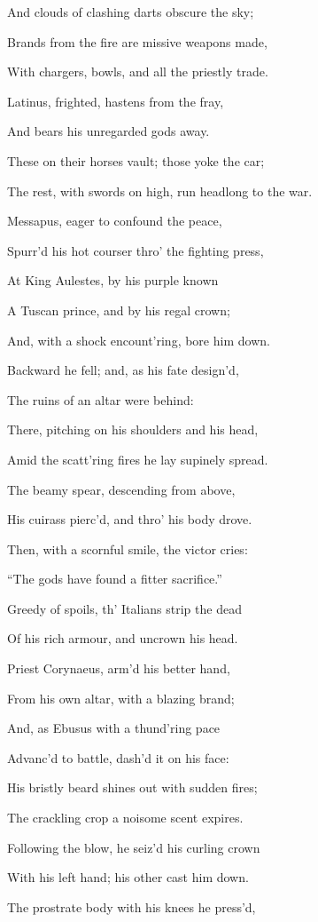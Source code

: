 And clouds of clashing darts obscure the sky;

Brands from the fire are missive weapons made,

With chargers, bowls, and all the priestly trade.

Latinus, frighted, hastens from the fray,

And bears his unregarded gods away.

These on their horses vault; those yoke the car;

The rest, with swords on high, run headlong to the war.

Messapus, eager to confound the peace,

Spurr’d his hot courser thro’ the fighting press,

At King Aulestes, by his purple known

A Tuscan prince, and by his regal crown;

And, with a shock encount’ring, bore him down.

Backward he fell; and, as his fate design’d,

The ruins of an altar were behind:

There, pitching on his shoulders and his head,

Amid the scatt’ring fires he lay supinely spread.

The beamy spear, descending from above,

His cuirass pierc’d, and thro’ his body drove.

Then, with a scornful smile, the victor cries:

“The gods have found a fitter sacrifice.”

Greedy of spoils, th’ Italians strip the dead

Of his rich armour, and uncrown his head.

Priest Corynaeus, arm’d his better hand,

From his own altar, with a blazing brand;

And, as Ebusus with a thund’ring pace

Advanc’d to battle, dash’d it on his face:

His bristly beard shines out with sudden fires;

The crackling crop a noisome scent expires.

Following the blow, he seiz’d his curling crown

With his left hand; his other cast him down.

The prostrate body with his knees he press’d,

